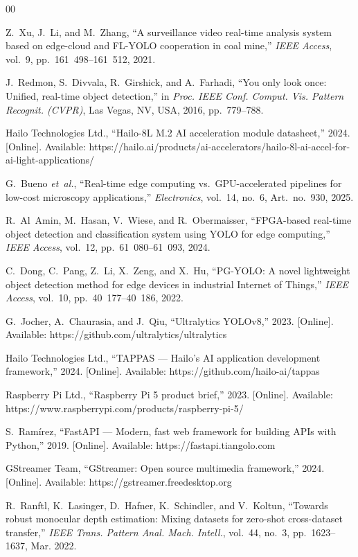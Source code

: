 \documentclass{ieeeaccess}
\begin{document}
\begin{thebibliography}{00}

 Z.~Xu, J.~Li, and M.~Zhang, ``A surveillance video real-time analysis system based on edge-cloud and FL-YOLO cooperation in coal mine,'' \emph{IEEE Access}, vol.~9, pp.~161~498--161~512, 2021.

 J.~Redmon, S.~Divvala, R.~Girshick, and A.~Farhadi, ``You only look once: Unified, real-time object detection,'' in \emph{Proc. IEEE Conf. Comput. Vis. Pattern Recognit. (CVPR)}, Las Vegas, NV, USA, 2016, pp.~779--788.

 Hailo Technologies Ltd., ``Hailo-8L M.2 AI acceleration module datasheet,'' 2024. [Online]. Available: https://hailo.ai/products/ai-accelerators/hailo-8l-ai-accel-for-ai-light-applications/

 G.~Bueno \emph{et~al.}, ``Real-time edge computing vs.\ GPU-accelerated pipelines for low-cost microscopy applications,'' \emph{Electronics}, vol.~14, no.~6, Art.~no.~930, 2025.

 R.~Al~Amin, M.~Hasan, V.~Wiese, and R.~Obermaisser, ``FPGA-based real-time object detection and classification system using YOLO for edge computing,'' \emph{IEEE Access}, vol.~12, pp.~61~080--61~093, 2024.

 C.~Dong, C.~Pang, Z.~Li, X.~Zeng, and X.~Hu, ``PG-YOLO: A novel lightweight object detection method for edge devices in industrial Internet of Things,'' \emph{IEEE Access}, vol.~10, pp.~40~177--40~186, 2022.

 G.~Jocher, A.~Chaurasia, and J.~Qiu, ``Ultralytics YOLOv8,'' 2023. [Online]. Available: https://github.com/ultralytics/ultralytics

 Hailo Technologies Ltd., ``TAPPAS --- Hailo's AI application development framework,'' 2024. [Online]. Available: https://github.com/hailo-ai/tappas

 Raspberry Pi Ltd., ``Raspberry Pi 5 product brief,'' 2023. [Online]. Available: https://www.raspberrypi.com/products/raspberry-pi-5/

 S.~Ram\'{i}rez, ``FastAPI --- Modern, fast web framework for building APIs with Python,'' 2019. [Online]. Available: https://fastapi.tiangolo.com

 GStreamer Team, ``GStreamer: Open source multimedia framework,'' 2024. [Online]. Available: https://gstreamer.freedesktop.org

 R.~Ranftl, K.~Lasinger, D.~Hafner, K.~Schindler, and V.~Koltun, ``Towards robust monocular depth estimation: Mixing datasets for zero-shot cross-dataset transfer,'' \emph{IEEE Trans. Pattern Anal. Mach. Intell.}, vol.~44, no.~3, pp.~1623--1637, Mar. 2022.


\end{thebibliography}
\end{document}
